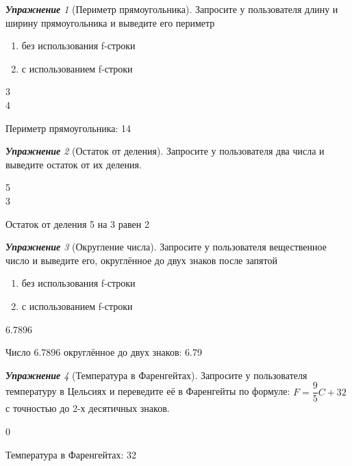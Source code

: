\documentclass[a4,12pt]{article}
\theoremstyle{remark}
\newtheorem{exercise}{\textbf{Упражнение}}[section]
\begin{document}
\begin{exercise}[Периметр прямоугольника]
Запросите у пользователя длину и ширину прямоугольника и выведите его периметр
\begin{enumerate}[label=\textbf{\alph*)}]
    \item без использования f-строки
    \item с использованием f-строки
\end{enumerate}
\begin{inputformat}
3\\
4
\end{inputformat}
    
\begin{outputformat}
Периметр прямоугольника: 14
\end{outputformat}
\end{exercise}

\pagebreak

\begin{exercise}[Остаток от деления]
Запросите у пользователя два числа и выведите остаток от их деления.

\begin{inputformat}
5\\
3
\end{inputformat}

\begin{outputformat}
Остаток от деления 5 на 3 равен 2
\end{outputformat}
\end{exercise}

\begin{exercise}[Округление числа]
Запросите у пользователя вещественное число и выведите его, округлённое до двух знаков после запятой
\begin{enumerate}[label=\textbf{\alph*)}]
    \item без использования f-строки
    \item с использованием f-строки
\end{enumerate}
\begin{inputformat}
6.7896
\end{inputformat}

\begin{outputformat}
Число 6.7896 округлённое до двух знаков: 6.79
\end{outputformat}
\end{exercise}

\begin{exercise}[Температура в Фаренгейтах]
Запросите у пользователя температуру в Цельсиях и переведите её в Фаренгейты по формуле: $F=\dfrac{9}{5}C + 32$ с точностью до 2-х десятичных знаков.

\begin{inputformat}
0
\end{inputformat}

\begin{outputformat}
Температура в Фаренгейтах: 32
\end{outputformat}
\end{exercise}
\end{document}
